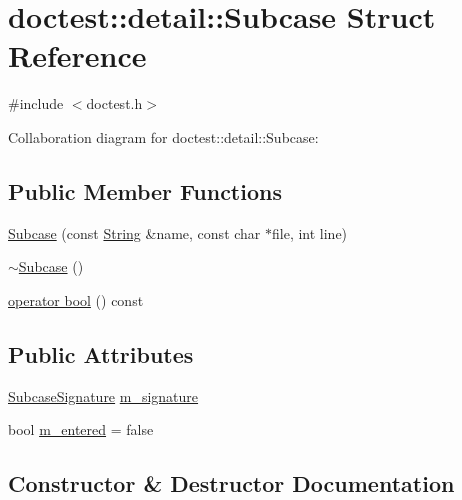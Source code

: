 \hypertarget{structdoctest_1_1detail_1_1Subcase}{}\section{doctest\+:\+:detail\+:\+:Subcase Struct Reference}
\label{structdoctest_1_1detail_1_1Subcase}


{\ttfamily \#include $<$doctest.\+h$>$}



Collaboration diagram for doctest\+:\+:detail\+:\+:Subcase\+:
\subsection*{Public Member Functions}
\begin{DoxyCompactItemize}
\item 
\hyperlink{structdoctest_1_1detail_1_1Subcase_a8f7d4a5ddfb8ae48663e5cfc786e6f12}{Subcase} (const \hyperlink{classdoctest_1_1String}{String} \&name, const char $\ast$file, int line)
\item 
\hyperlink{structdoctest_1_1detail_1_1Subcase_a4812988371d226236be53c302c86abe2}{$\sim$\+Subcase} ()
\item 
\hyperlink{structdoctest_1_1detail_1_1Subcase_a91a520769fc55fb5be781f949ef3200f}{operator bool} () const
\end{DoxyCompactItemize}
\subsection*{Public Attributes}
\begin{DoxyCompactItemize}
\item 
\hyperlink{structdoctest_1_1SubcaseSignature}{Subcase\+Signature} \hyperlink{structdoctest_1_1detail_1_1Subcase_a54730e9b88cf33ea4a5c873164029202}{m\+\_\+signature}
\item 
bool \hyperlink{structdoctest_1_1detail_1_1Subcase_acb703ee6e769f56fba4053447c1a36e4}{m\+\_\+entered} = false
\end{DoxyCompactItemize}


\subsection{Constructor \& Destructor Documentation}
\mbox{\label{structdoctest_1_1detail_1_1Subcase_a8f7d4a5ddfb8ae48663e5cfc786e6f12}} 
